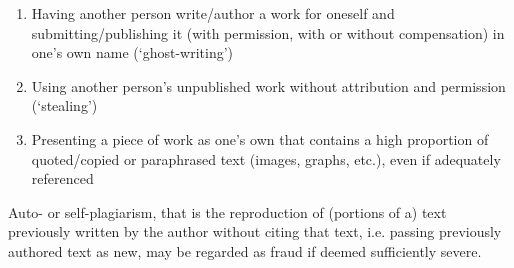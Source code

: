 \documentclass[conference,compsoc]{IEEEtran}
\begin{document}
\begin{itemize}
\begin{enumerate}
		      \item Having another person write/author a work for oneself and submitting/publishing it (with permission, with or without compensation) in one’s own name (‘ghost-writing’)
		      \item Using another person’s unpublished work without attribution and permission (‘stealing’)
		      \item Presenting a piece of work as one’s own that contains a high proportion of quoted/copied or paraphrased text (images, graphs, etc.), even if adequately referenced
	      \end{enumerate}
	      Auto- or self-plagiarism, that is the reproduction of (portions of a) text previously written by the author without citing that text, i.e. passing previously authored text as new, may be regarded as fraud if deemed sufficiently severe.
\end{itemize}
\end{document}
